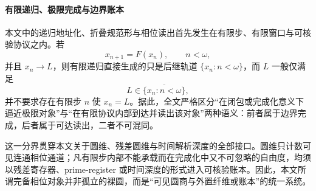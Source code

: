 \paragraph{有限递归、极限完成与边界账本}
本文中的递归地址化、折叠规范形与相位读出首先发生在有限步、有限窗口与可核验协议之内。若
\[
x_{n+1}=F(x_n),\qquad n<\omega,
\]
并且 \(x_n\to L\)，则有限递归直接生成的只是后继轨道 \(\{x_n:n<\omega\}\)，而 \(L\) 一般仅满足
\[
L\in\overline{\{x_n:n<\omega\}},
\]
并不要求存在有限步 \(n\) 使 \(x_n=L\)。据此，全文严格区分“在闭包或完成化意义下逼近极限对象”与“在有限协议内部到达并读出该对象”两种语义：前者属于边界完成，后者属于可达读出，二者不可混同。
\par
这一分界贯穿本文关于圆维、残差圆维与时间解析深度的全部接口。圆维只计数可见连通相位通道；凡有限步内部不能承载而在完成化中又不可忽略的自由度，均须以残差寄存器、prime-register 或时间深度的形式进入可核验账本。因此，本文所谓完备相位对象并非孤立的裸圆，而是“可见圆商与外置纤维或账本”的统一系统。
